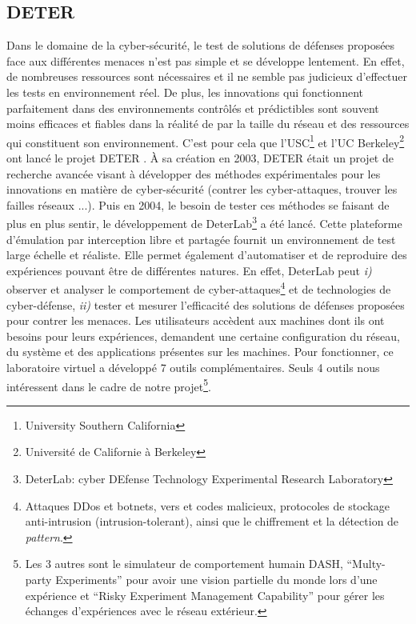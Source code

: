 \subsection{DETER}
\label{subsection:DETER}

Dans le domaine de la cyber-sécurité, le test de solutions de défenses proposées
face aux différentes menaces n'est pas simple et se développe lentement. En
effet, de nombreuses ressources sont nécessaires et il ne semble pas judicieux
d'effectuer les tests en environnement réel. De plus, les innovations qui
fonctionnent parfaitement dans des environnements contrôlés et prédictibles
sont souvent moins efficaces et fiables dans la réalité de par la taille du
réseau et des ressources qui constituent son environnement.  C'est pour cela que
l'USC\footnote{University Southern California} et l'UC
Berkeley\footnote{Université de Californie à Berkeley} ont lancé le projet DETER
\citep{DETER_Project, DETER_benzel2011science, DETER_mirkovic2010deter}. À sa
création en 2003, DETER était un projet de recherche avancée visant à
développer des méthodes expérimentales pour les innovations en matière de
cyber-sécurité (contrer les cyber-attaques, trouver les failles réseaux
...). Puis en 2004, le besoin de tester ces méthodes se faisant de plus en plus
sentir, le développement de DeterLab\footnote{DeterLab: cyber DEfense Technology
  Experimental Research Laboratory} a été lancé. Cette plateforme d'émulation
par interception libre et partagée fournit un environnement de test large
échelle et réaliste. Elle permet également d'automatiser et de reproduire des
expériences pouvant être de différentes natures. En effet, DeterLab peut
\textit{i)} observer et analyser le comportement de cyber-attaques\footnote{
  Attaques DDos et botnets, vers et codes malicieux, protocoles de stockage
  anti-intrusion (intrusion-tolerant), ainsi que le chiffrement et la détection
  de \textit{pattern}.} et de technologies de cyber-défense, \textit{ii)} tester et
mesurer l'efficacité des solutions de défenses proposées pour contrer les
menaces. Les utilisateurs accèdent aux machines dont ils ont besoins pour leurs
expériences, demandent une certaine configuration du réseau, du système et des
applications présentes sur les machines. Pour fonctionner, ce laboratoire virtuel a
développé 7 outils complémentaires. Seuls 4 outils nous intéressent dans le cadre de notre projet\footnote{Les 3 autres sont le simulateur de comportement humain DASH, ``Multy-party Experiments'' pour avoir une vision partielle du monde lors d'une expérience et ``Risky Experiment Management Capability'' pour gérer les échanges d'expériences avec le réseau extérieur.}.


